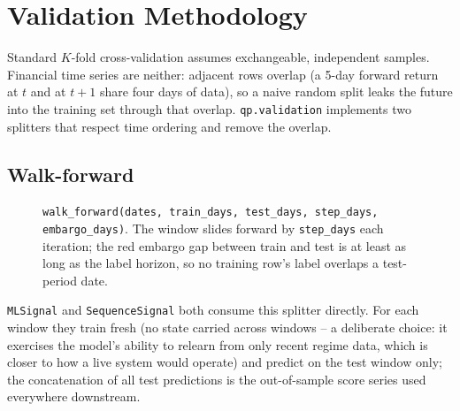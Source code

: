 \chapter{Validation Methodology}

Standard $K$-fold cross-validation assumes exchangeable, independent samples.
Financial time series are neither: adjacent rows overlap (a 5-day forward
return at $t$ and at $t+1$ share four days of data), so a naive random split
leaks the future into the training set through that overlap. \texttt{qp.validation}
implements two splitters that respect time ordering and remove the overlap.

\section{Walk-forward}

\begin{figure}[h]
\centering
{}
\caption{\texttt{walk\_forward(dates, train\_days, test\_days, step\_days, embargo\_days)}.
The window slides forward by \texttt{step\_days} each iteration; the red embargo
gap between train and test is at least as long as the label horizon, so no
training row's label overlaps a test-period date.}
\end{figure}

\texttt{MLSignal} and \texttt{SequenceSignal} both consume this splitter directly.
For each window they train fresh (no state carried across windows -- a
deliberate choice: it exercises the model's ability to relearn from only recent
regime data, which is closer to how a live system would operate) and predict
on the test window only; the concatenation of all test predictions is the
out-of-sample score series used everywhere downstream.

